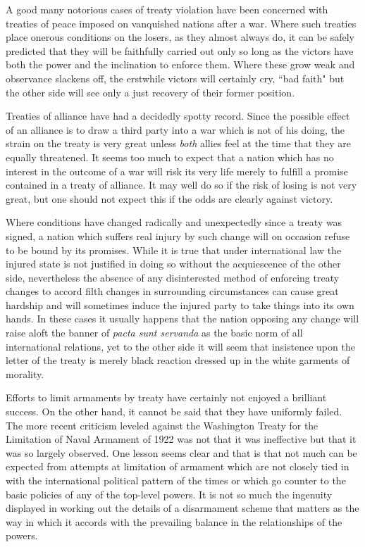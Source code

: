 \begin{introduction}
A good many notorious cases of treaty violation have been concerned with treaties of peace imposed on vanquished nations after a war. Where such treaties place onerous conditions on the losers, as they almost always do, it can be safely predicted that they will be faithfully carried out only so long as the victors have both the power and the inclination to enforce them. Where these grow weak and observance slackens off, the erstwhile victors will certainly cry, ``bad faith" but the other side will see only a just recovery of their former position.

Treaties of alliance have had a decidedly spotty record. Since the possible effect of an alliance is to draw a third party into a war which is not of his doing, the strain on the treaty is very great unless \emph{both} allies feel at the time that they are equally threatened. It seems too much to expect that a nation which has no interest in the outcome of a war will risk its very life merely to fulfill a promise contained in a treaty of alliance. It may well do so if the risk of losing is not very great, but one should not expect this if the odds are clearly against victory.

Where conditions have changed radically and unexpectedly since a treaty was signed, a nation which suffers real injury by such change will on occasion refuse to be bound by its promises. While it is true that under international law the injured state is not justified in doing so without the acquiescence of the other side, nevertheless the absence of any disinterested method of enforcing treaty changes to accord filth changes in surrounding circumstances can cause great hardship and will sometimes induce the injured party to take things into its own hands. In these cases it usually happens that the nation opposing any change will raise aloft the banner of \emph{pacta sunt servanda} as the basic norm of all international relations, yet to the other side it will seem that insistence upon the letter of the treaty is merely black reaction dressed up in the white garments of morality.

Efforts to limit armaments by treaty have certainly not enjoyed a brilliant success. On the other hand, it cannot be said that they have uniformly failed. The more recent criticism leveled against the Washington Treaty for the Limitation of Naval Armament of 1922 was not that it was ineffective but that it was so largely observed. One lesson seems clear and that is that not much can be expected from attempts at limitation of armament which are not closely tied in with the international political pattern of the times or which go counter to the basic policies of any of the top-level powers. It is not so much the ingenuity displayed in working out the details of a disarmament scheme that matters as the way in which it accords with the prevailing balance in the relationships of the powers.


\end{introduction}
